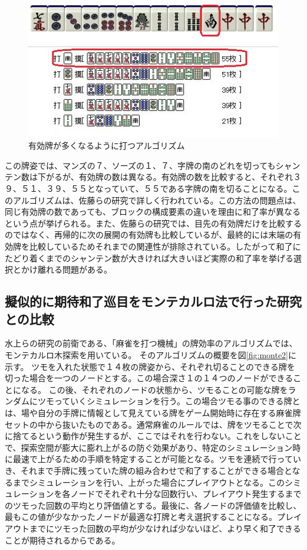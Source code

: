 \begin{figure}[h]
 \centering
 \includegraphics[keepaspectratio, scale=1,bb=0 0 320 239]
      {img/yuko.jpg}
 \caption{有効牌が多くなるように打つアルゴリズム}
 \label{zu}
\end{figure}

この牌姿では、マンズの７、ソーズの１、７、字牌の南のどれを切ってもシャンテン数は下がるが、有効牌の数は異なる。有効牌の数を比較すると、それぞれ３９、５１、３９、５５となっていて、５５である字牌の南を切ることになる。このアルゴリズムは、佐藤ら\cite{zentsu}の研究で詳しく行われている。この方法の問題点は、同じ有効牌の数であっても、ブロックの構成要素の違いを理由に和了率が異なるという点が挙げられる。また、佐藤らの研究では、目先の有効牌だけを比較するのではなく、再帰的に次の展開の有効牌も比較しているが、最終的には末端の有効牌を比較しているためそれまでの関連性が排除されている。したがって和了にたどり着くまでのシャンテン数が大きければ大きいほど実際の和了率を挙げる選択とかけ離れる問題がある。


\subsection{擬似的に期待和了巡目をモンテカルロ法で行った研究との比較}

水上ら\cite{bakuuti}の研究の前衛である、「麻雀を打つ機械」\cite{nmizu}の牌効率のアルゴリズムでは、モンテカルロ木探索を用いている。
そのアルゴリズムの概要を図\ref{fig:monte2}に示す。
ツモを入れた状態で１４枚の牌姿から、それぞれ切ることのできる牌を切った場合を一つのノードとする。この場合深さ１の１４つのノードができることになる。
この後、それぞれのノードの状態から、ツモることの可能な牌をランダムにツモっていくシミュレーションを行う。この場合ツモる事のできる牌とは、場や自分の手牌に情報として見えている牌をゲーム開始時に存在する麻雀牌セットの中から抜いたものである。通常麻雀のルールでは、牌をツモることで次に捨てるという動作が発生するが、ここではそれを行わない。これをしないことで、探索空間が膨大に膨れ上がるの防ぐ効果があり、特定のシミュレーション時に最速で上がるための手順を特定することが可能となる。ツモを連続で行っていき、それまで手牌に残っていた牌の組み合わせで和了することができる場合となるまでシミュレーションを行い、上がった場合にプレイアウトとなる。このシミュレーションを各ノードでそれぞれ十分な回数行い、プレイアウト発生するまでのツモった回数の平均とり評価値とする。最後に、各ノードの評価値を比較し、最もこの値が少なかったノードが最適な打牌と考え選択することになる。プレイアウトまでにツモった回数の平均が少なければ少ないほど、より早く和了できることが期待されるからである。

